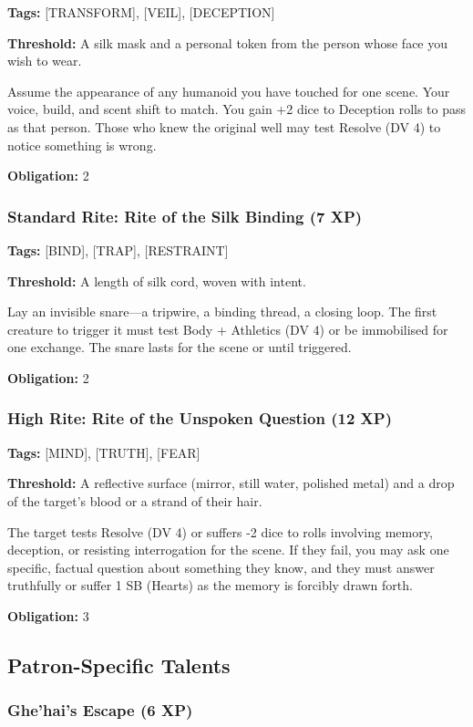 \textbf{Tags:} [TRANSFORM], [VEIL], [DECEPTION]

\textbf{Threshold:} A silk mask and a personal token from the person whose face you wish to wear.

Assume the appearance of any humanoid you have touched for one scene. Your voice, build, and scent shift to match. You gain +2 dice to Deception rolls to pass as that person. Those who knew the original well may test Resolve (DV 4) to notice something is wrong.

\textbf{Obligation:} 2

\subsubsection{Standard Rite: Rite of the Silk Binding (7 XP)}

\textbf{Tags:} [BIND], [TRAP], [RESTRAINT]

\textbf{Threshold:} A length of silk cord, woven with intent.

Lay an invisible snare—a tripwire, a binding thread, a closing loop. The first creature to trigger it must test Body + Athletics (DV 4) or be immobilised for one exchange. The snare lasts for the scene or until triggered.

\textbf{Obligation:} 2

\subsubsection{High Rite: Rite of the Unspoken Question (12 XP)}

\textbf{Tags:} [MIND], [TRUTH], [FEAR]

\textbf{Threshold:} A reflective surface (mirror, still water, polished metal) and a drop of the target's blood or a strand of their hair.

The target tests Resolve (DV 4) or suffers -2 dice to rolls involving memory, deception, or resisting interrogation for the scene. If they fail, you may ask one specific, factual question about something they know, and they must answer truthfully or suffer 1 SB (Hearts) as the memory is forcibly drawn forth.

\textbf{Obligation:} 3

\subsection{Patron-Specific Talents}

\subsubsection{Ghe'hai's Escape (6 XP)}

